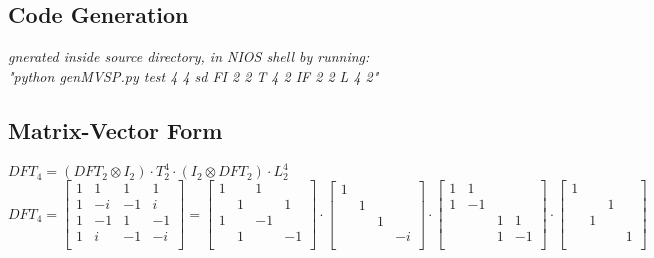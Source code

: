 \documentclass[11pt]{article}
\begin{document}
\subsection*{Code Generation}
\emph{gnerated inside source directory, in NIOS shell by running: \\"python genMVSP.py test 4 4 sd FI 2 2 T 4 2 IF 2 2 L 4 2" }
\subsection*{Matrix-Vector Form}
$DFT_4 = (DFT_2\otimes I_2)\cdot T^4_2\cdot (I_2\otimes DFT_2)\cdot L^4_2$\\
\begin{displaymath}
	DFT_4 = 
	\begin{bmatrix}
	1 & 1 & 1 & 1 \\
	1 & -i & -1 & i \\
	1 & -1 & 1 & -1 \\
	1 & i & -1 & -i \\
	\end{bmatrix}
	=  
	\begin{bmatrix}
	1 &  & 1 & \\
	 & 1 &  & 1 \\
	1 &  & -1 &  \\
	 & 1 &  & -1 \\
	\end{bmatrix}
	\cdot
	\begin{bmatrix}
	1 &  &  & \\
	 & 1 &  & \\
	 &  & 1 &  \\
	 &  &  & -i \\
	\end{bmatrix}
	\cdot
	\begin{bmatrix}
	1 & 1 &  & \\
	1 & -1 &  &  \\
	 &  & 1 & 1 \\
	 &  & 1 & -1 \\
	\end{bmatrix}
	\cdot
	\begin{bmatrix}
	1 &  &  & \\
	 &  & 1 & \\
	 & 1 &  &  \\
	 &  &  & 1 \\
	\end{bmatrix}
\end{displaymath}
\end{document}
